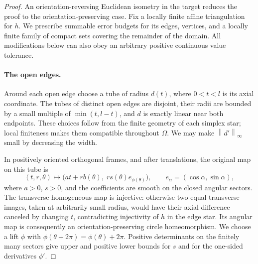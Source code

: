\documentclass[11pt]{article}
\numberwithin{equation}{section}
\theoremstyle{definition}
\theoremstyle{remark}
\begin{document}
\begin{proof}
An orientation-reversing Euclidean isometry in the target reduces
the proof to the orientation-preserving case.  Fix a locally finite
affine triangulation for $h$.  We prescribe summable error budgets
for its edges, vertices, and a locally finite family of compact sets
covering the remainder of the domain.  All modifications below can
also obey an arbitrary positive continuous value tolerance.

\paragraph{The open edges.}
Around each open edge choose a tube of radius $d(t)$, where
$0<t<l$ is its axial coordinate.  The tubes of distinct open edges
are disjoint, their radii are bounded by a small multiple of
$\min(t,l-t)$, and $d$ is exactly linear near both endpoints.
These choices follow from the finite geometry of each simplex star;
local finiteness makes them compatible throughout $\Omega$.
We may make $\left\lVert d'\right\rVert_\infty$ small by decreasing the width.

In positively oriented orthogonal frames, and after translations,
the original map on this tube is
\begin{equation}
 \label{sm:edge-form}
 (t,r,\theta)\longmapsto
 \bigl(at+r b(\theta),\;r s(\theta)e_{\phi(\theta)}\bigr),
 \qquad e_\alpha=(\cos\alpha,\sin\alpha),
\end{equation}
where $a>0$, $s>0$, and the coefficients are smooth on the closed
angular sectors.  The transverse homogeneous map is injective:
otherwise two equal transverse images, taken at arbitrarily small
radius, would have their axial difference canceled by changing $t$,
contradicting injectivity of $h$ in the edge star.  Its angular
map is consequently an orientation-preserving circle
homeomorphism.  We choose a lift $\phi$ with
$\phi(\theta+2\pi)=\phi(\theta)+2\pi$.
Positive determinants on the finitely many sectors give upper and
positive lower bounds for $s$ and for the one-sided derivatives
$\phi'$.


\end{proof}
\end{document}

